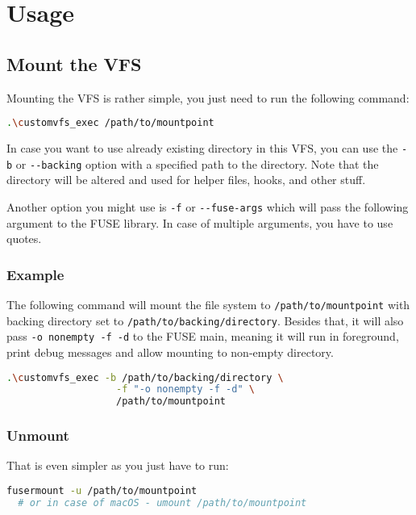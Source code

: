 \chapter{Usage}

\section*{Mount the VFS}

Mounting the VFS is rather simple, you just need to run the following command:

\begin{lstlisting}[language=bash, basicstyle=\ttfamily\small]
  .\customvfs_exec /path/to/mountpoint
\end{lstlisting}

In case you want to use already existing directory in this VFS, you can use the \texttt{-b} or \texttt{-{}-backing} option with a specified path to the directory.
Note that the directory will be altered and used for helper files, hooks, and other stuff.

Another option you might use is \texttt{-f} or \texttt{-{}-fuse-args} which will pass the following argument to the FUSE library.
In case of multiple arguments, you have to use quotes.

\subsection*{Example}

The following command will mount the file system to \texttt{/path/to/mountpoint} with backing directory set to \texttt{/path/to/backing/directory}.
Besides that, it will also pass \texttt{-o nonempty -f -d} to the FUSE main, meaning it will run in foreground, print debug messages and allow mounting to non-empty directory.

\begin{lstlisting}[language=bash, basicstyle=\ttfamily\small]
  .\customvfs_exec -b /path/to/backing/directory \
                   -f "-o nonempty -f -d" \
                   /path/to/mountpoint
\end{lstlisting}

\subsection*{Unmount}

That is even simpler as you just have to run:

\begin{lstlisting}[language=bash, basicstyle=\ttfamily\small]
  fusermount -u /path/to/mountpoint
  # or in case of macOS - umount /path/to/mountpoint
\end{lstlisting}

